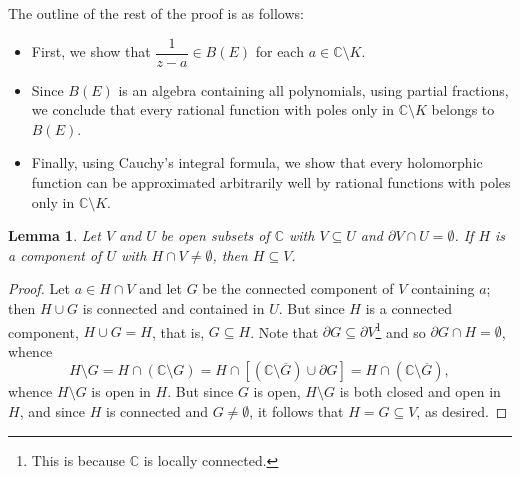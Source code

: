 \documentclass[11pt]{article}
\theoremstyle{thmstyle}
\newtheorem{lemma}[theorem]{Lemma}
\theoremstyle{defstyle}
\newcommand{\bbC}{\mathbb{C}}
\begin{document}
The outline of the rest of the proof is as follows: 
\begin{itemize}
    \item First, we show that $\dfrac{1}{z - a}\in B(E)$ for each $a\in\bbC\setminus K$. 
    \item Since $B(E)$ is an algebra containing all polynomials, using partial fractions, we conclude that every rational function with poles only in $\bbC\setminus K$ belongs to $B(E)$.
    \item Finally, using Cauchy's integral formula, we show that every holomorphic function can be approximated arbitrarily well by rational functions with poles only in $\bbC\setminus K$.
\end{itemize}

\begin{lemma}
    Let $V$ and $U$ be open subsets of $\bbC$ with $V\subseteq U$ and $\partial V\cap U = \emptyset$. If $H$ is a component of $U$ with $H\cap V\ne\emptyset$, then $H\subseteq V$.
\end{lemma}
\begin{proof}
    Let $a\in H\cap V$ and let $G$ be the connected component of $V$ containing $a$; then $H\cup G$ is connected and contained in $U$. But since $H$ is a connected component, $H\cup G = H$, that is, $G\subseteq H$. Note that $\partial G\subseteq\partial V$\footnote{This is because $\bbC$ is locally connected.} and so $\partial G\cap H = \emptyset$, whence 
    \begin{equation*}
        H\setminus G = H\cap(\bbC\setminus G) = H\cap\left[(\bbC\setminus\overline G)\cup\partial G\right] = H\cap(\bbC\setminus\overline G),
    \end{equation*}
    whence $H\setminus G$ is open in $H$. But since $G$ is open, $H\setminus G$ is both closed and open in $H$, and since $H$ is connected and $G\ne\emptyset$, it follows that $H = G\subseteq V$, as desired.
\end{proof}
\end{document}
